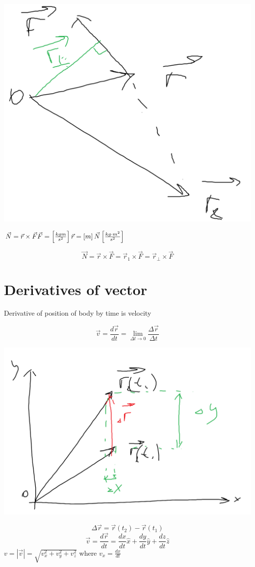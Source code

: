 \begin{center}
	\includegraphics[width=0.3\linewidth]{./lect3/pic3.png}
\end{center}

$\vec{N} = \vec{r} \times \vec{F} \\
\vec{F} = \left[\frac{kg m}{s^2}\right] \\
\vec{r} = \left[m\right]\\
\vec{N} \left[\frac{kg \cdot m^2}{s^2}\right]$

$$\vec{N} = \vec{r} \times \vec{F} =  \vec{r}_1 \times \vec{F} = \vec{r}_{\perp} \times \vec{F} $$

\section{Derivatives of vector}

Derivative of position of body by time is velocity

$$\vec{v} = \frac{d\vec{r}}{dt} = \lim_{\Delta t \to 0} \frac{\Delta\vec{r}}{\Delta t}$$


\begin{center}
	\includegraphics[width=\linewidth]{./lect3/pic4.png}
\end{center}

$$\Delta \vec{r} = \vec{r}(t_2) - \vec{r}(t_1) $$
$$\vec{v} = \frac{d \vec{r}}{dt} = \frac{dx}{dt}\hat{x} + \frac{dy}{dt}\hat{y} + \frac{dz}{dt}\hat{z} $$
$v = | \vec{v} | = \sqrt{v_x^2 + v_y^2 + v_z^2}$ where $v_x = \frac{dx}{dt}$

